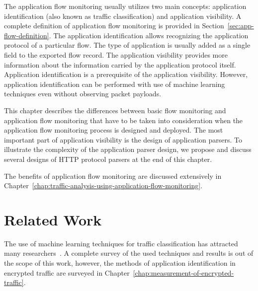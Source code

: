 The application flow monitoring usually utilizes two main concepts: application identification (also known as traffic classification) and application visibility. A complete definition of application flow monitoring is provided in Section~\ref{sec:app-flow-definition}. The application identification allows recognizing the application protocol of a particular flow. The type of application is usually added as a single field to the exported flow record. The application visibility provides more information about the information carried by the application protocol itself. Application identification is a prerequisite of the application visibility. However, application identification can be performed with use of machine learning techniques even without observing packet payloads.

This chapter describes the differences between basic flow monitoring and application flow monitoring that have to be taken into consideration when the application flow monitoring process is designed and deployed. The most important part of application visibility is the design of application parsers. To illustrate the complexity of the application parser design, we propose and discuss several designs of HTTP protocol parsers at the end of this chapter.

The benefits of application flow monitoring are discussed extensively in Chapter~\ref{chap:traffic-analysis-using-application-flow-monitoring}.

\section{Related Work}\label{sec:app-rel-work}


The use of machine learning techniques for traffic classification has attracted many researchers~\cite{Nguyen-2008-Survey, Dainotti-2012-Issues, Finsterbusch-2014-Survey}. A complete survey of the used techniques and results is out of the scope of this work, however, the methods of application identification in encrypted traffic are surveyed in Chapter~\ref{chap:measurement-of-encrypted-traffic}.

